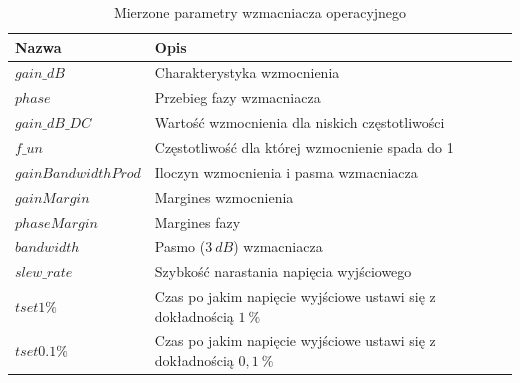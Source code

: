 \documentclass[twoside,pl,final]{labman}
\begin{document}
\begin{table}[htbp]
  \centering
  \caption{Mierzone parametry wzmacniacza operacyjnego}
  \label{tab:work:measure}
  \begin{tabular}{l p{}}
    \hline \hline
    Nazwa & Opis \\
    \hline
    $gain\_dB$ & Charakterystyka wzmocnienia \\
    $phase$    & Przebieg fazy wzmacniacza \\
    $gain\_dB\_DC$ & Wartość wzmocnienia dla niskich częstotliwości \\
    $f\_un$ & Częstotliwość dla której wzmocnienie spada do 1 \\
    $gainBandwidthProd$ & Iloczyn wzmocnienia i pasma wzmacniacza \\
    $gainMargin$ & Margines wzmocnienia \\
    $phaseMargin$ & Margines fazy \\
    $bandwidth$ & Pasmo ($3~dB$) wzmacniacza \\
    $slew\_rate$ & Szybkość narastania napięcia wyjściowego \\
    $tset1\%$ & Czas po jakim napięcie wyjściowe ustawi się z dokładnością $1~\%$ \\
    $tset0.1\%$ & Czas po jakim napięcie wyjściowe ustawi się z dokładnością $0,1~\%$ \\
     \hline \hline
  \end{tabular}
\end{table}



\end{document}
